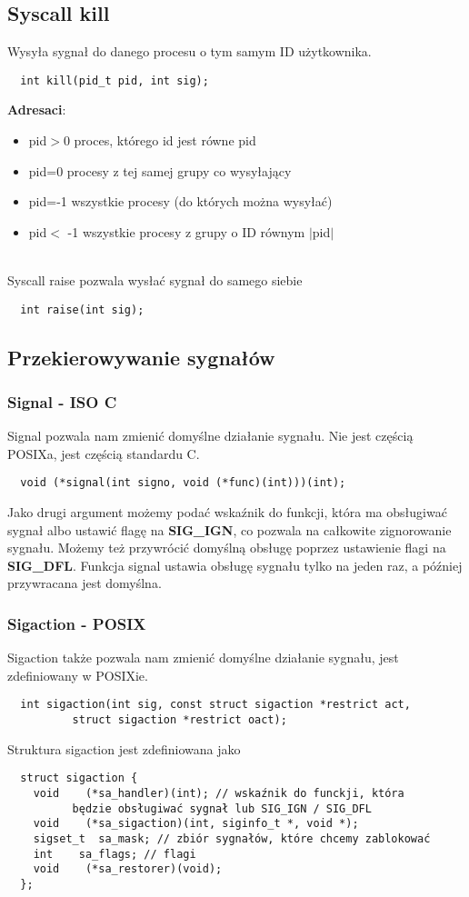 \documentclass[12pt, a4paper, polish, openany]{book}
\begin{document}
\subsection{Syscall kill}
\label{kill}
Wysyła sygnał do danego procesu o tym samym ID użytkownika. 
\begin{verbatim}
  int kill(pid_t pid, int sig);
\end{verbatim}
\textbf{Adresaci}:
\begin{itemize}
  \item pid$>$0 proces, którego id jest równe pid
  \item pid=0 procesy z tej samej grupy co wysyłający
  \item pid=-1 wszystkie procesy (do których można wysyłać)
  \item pid$<$ -1 wszystkie procesy z grupy o ID równym $|$pid$|$
\end{itemize}
\\
Syscall raise pozwala wysłać sygnał do samego siebie
\begin{verbatim}
  int raise(int sig);
\end{verbatim}
\subsection{Przekierowywanie sygnałów}
\subsubsection{Signal - ISO C}
Signal pozwala nam zmienić domyślne działanie sygnału. Nie jest częścią POSIXa, jest częścią standardu C.
\begin{verbatim}
  void (*signal(int signo, void (*func)(int)))(int);
\end{verbatim}
Jako drugi argument możemy podać wskaźnik do funkcji, która ma obsługiwać sygnał albo ustawić flagę na \textbf{SIG\_IGN}, co pozwala na całkowite zignorowanie sygnału. Możemy też przywrócić domyślną obsługę poprzez ustawienie flagi na \textbf{SIG\_DFL}. Funkcja signal ustawia obsługę sygnału tylko na jeden raz, a później przywracana jest domyślna.
\subsubsection{Sigaction - POSIX}
Sigaction także pozwala nam zmienić domyślne działanie sygnału, jest zdefiniowany w POSIXie.
\begin{verbatim}
  int sigaction(int sig, const struct sigaction *restrict act,
          struct sigaction *restrict oact);
\end{verbatim}
Struktura sigaction jest zdefiniowana jako
\begin{verbatim}
  struct sigaction {
    void    (*sa_handler)(int); // wskaźnik do funckji, która
          będzie obsługiwać sygnał lub SIG_IGN / SIG_DFL
    void    (*sa_sigaction)(int, siginfo_t *, void *); 
    sigset_t  sa_mask; // zbiór sygnałów, które chcemy zablokować
    int    sa_flags; // flagi
    void    (*sa_restorer)(void);
  };
\end{verbatim}
\end{document}
